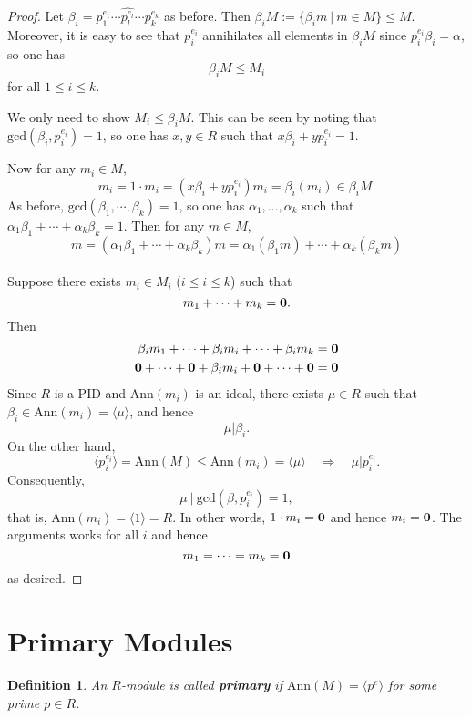 \documentclass[12pt]{amsbook}
\newtheorem{definition}[theorem]{Definition}
\begin{document}
\begin{proof}
    Let $\beta_i=p_1^{e_1}\cdots \widehat{p_l^{e_l}}\cdots p_k^{e_k}$ as before.
    Then $\beta_{i}M:=\{\beta_{i}m\ |\ m\in M\}\leq M$. Moreover, it is easy to see that $p_i^{e_i}$ annihilates all elements in $\beta_iM$ since $p_i^{e_i}\beta_i = \alpha$, so one has
    $$\beta_i M\leq M_i$$
    for all $1 \leq i \leq k.$

    \medskip
    \noindent{} We only need to show $M_i \leq \beta_iM$. This can be seen by noting that $\mathrm{gcd}(\beta_i,p_i^{e_i})=1$, so one has $x, y \in R$ such that $x\beta_i+yp_i^{e_i}=1$.
        
    Now for any $m_i\in M$, 
    $$m_i= 1\cdot m_i = (x\beta_i+yp_i^{e_i})m_i=\beta_i(m_i)\in \beta_i M.$$
     As before, $\mathrm{gcd}(\beta_1,\cdots ,\beta_k)=1$, so one has $\alpha_1, \dots, \alpha_k$ such that $\alpha_1\beta_1+\cdots+\alpha_k\beta_k=1$. Then for any $m\in M$,
    $$m=(\alpha_1\beta_1+\cdots+\alpha_k\beta_k)m= \alpha_1(\beta_1m)+\cdots+\alpha_k(\beta_km)$$\\
     Suppose there exists  $m_i \in M_i$ ($i \leq i \leq k$) such that
    $$m_1 + \dots + m_k = {\bf 0}.$$
    Then 
    \begin{align*}
          \beta_im_1 + \dots + \beta_im_i + \dots + \beta_im_k &= {\bf 0}\\
            {\bf 0}+ \dots + {\bf 0} + \beta_i m_i + {\bf 0} + \dots + {\bf 0} &= {\bf 0}
        \end{align*}
        Since $R$ is a PID and $\mathrm{Ann}(m_i)$ is an ideal, there exists $\mu \in R$ such that $\beta_i \in \mathrm{Ann}(m_i) = \langle \mu \rangle$, and hence 
        $$\mu | \beta_i.$$ 
        On the other hand, 
        $$\langle p_i^{e_i} \rangle = \mathrm{Ann}(M) \leq \mathrm{Ann}(m_i) = \langle \mu \rangle  \quad \Rightarrow \quad \mu | p_i^{e_i}.$$
        Consequently, $$\mu\ |\ \mathrm{gcd}(\beta,p_i^{e_i}) = 1,$$
        that is, $\mathrm{Ann}(m_i) = \langle 1 \rangle = R$. In other words, $1\cdot m_i = {\bf 0}$ and hence $m_i = {\bf 0}$. The arguments works for all $i$ and hence 
        $$m_1 = \dots = m_k = {\bf 0}$$
        as desired.
\end{proof}

\section{Primary Modules}
\begin{definition}
    An $R$-module is called {\bf primary} if $\mathrm{Ann}(M)=\langle p^e\rangle$ for some prime $p\in R$.
\end{definition}
\end{document}
